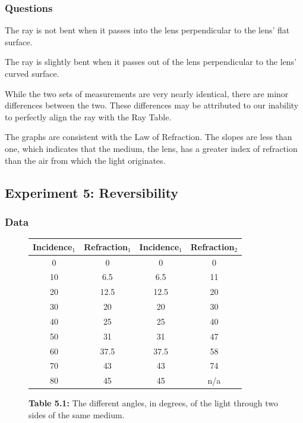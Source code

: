 \documentclass[12pt]{article}
\begin{document}
\subsubsection{Questions}

\subsubsubsection{}

The ray is not bent when it passes into the lens perpendicular to the lens' flat
surface.

\subsubsubsection{}

The ray is slightly bent when it passes out of the lens perpendicular to the
lens' curved surface.

\subsubsubsection{}

While the two sets of measurements are very nearly identical, there are minor
differences between the two. These differences may be attributed to our
inability to perfectly align the ray with the Ray Table.

\subsubsubsection{}

The graphs are consistent with the Law of Refraction. The slopes are less than
one, which indicates that the medium, the lens, has a greater index of
refraction than the air from which the light originates. 



\subsection{Experiment 5: Reversibility}

\subsubsection{Data}

\begin{figure}[H]
  \label{tab:5.1}
  \caption{\textbf{Table 5.1:} The different angles, in degrees, of the light
    through two sides of the same medium.}
  \begin{center}
    \begin{tabular}{|c|c|c|c|}
      \hline
      Incidence\(_1\) & Refraction\(_1\) & Incidence\(_1\) & Refraction\(_2\) \\
      \hline
      0  & 0    & 0    & 0 \\
      10 & 6.5  & 6.5  & 11 \\
      20 & 12.5 & 12.5 & 20 \\
      30 & 20   & 20   & 30 \\
      40 & 25   & 25   & 40 \\
      50 & 31   & 31   & 47 \\
      60 & 37.5 & 37.5 & 58 \\
      70 & 43   & 43   & 74 \\
      80 & 45   & 45   & n/a \\
      \hline
    \end{tabular}
  \end{center}
\end{figure}
\end{document}
